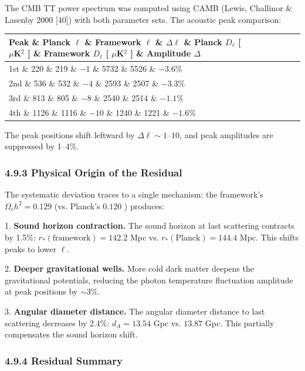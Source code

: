 \documentclass[11pt,a4paper]{article}
\theoremstyle{definition}\newtheorem{definition}{Definition}
\theoremstyle{remark}\newtheorem{remark}{Remark}
\begin{document}
The CMB TT power spectrum was computed using CAMB (Lewis, Challinor \& Lasenby 2000 [40]) with both parameter sets. The acoustic peak comparison:

\begin{longtable}{lllllll}
\hline
Peak \& Planck $\ell$ \& Framework $\ell$ \& $\Delta\ell$ \& Planck $D_\ell$ [ $\mu$K$^2$ ] \& Framework $D_\ell$ [ $\mu$K$^2$ ] \& Amplitude $\Delta$ \\
\hline
1st \& 220 \& 219 \& $-1$ \& 5732 \& 5526 \& $-3.6\%$ \\
2nd \& 536 \& 532 \& $-4$ \& 2593 \& 2507 \& $-3.3\%$ \\
3rd \& 813 \& 805 \& $-8$ \& 2540 \& 2514 \& $-1.1\%$ \\
4th \& 1126 \& 1116 \& $-10$ \& 1240 \& 1221 \& $-1.6\%$ \\
\hline
\end{longtable}
The peak positions shift leftward by $\Delta\ell \sim 1$–$10$, and peak amplitudes are suppressed by 1–4\%.
\subsubsection{4.9.3 Physical Origin of the Residual}

The systematic deviation traces to a single mechanism: the framework's $\Omega_c h^2 = 0.129$ (vs. Planck's $0.120$ ) produces:

1. \textbf{Sound horizon contraction.} The sound horizon at last scattering contracts by 1.5\%: $r_*({\text{framework}}) = 142.2$ Mpc vs. $r_*({\text{Planck}}) = 144.4$ Mpc. This shifts peaks to lower $\ell$.

2. \textbf{Deeper gravitational wells.} More cold dark matter deepens the gravitational potentials, reducing the photon temperature fluctuation amplitude at peak positions by $\sim 3\%$.

3. \textbf{Angular diameter distance.} The angular diameter distance to last scattering decreases by 2.4\%: $d_A = 13.54$ Gpc vs. $13.87$ Gpc. This partially compensates the sound horizon shift.
\subsubsection{4.9.4 Residual Summary}
\end{document}
